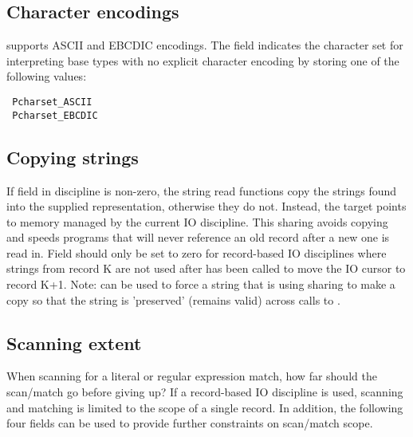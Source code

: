 \subsection{Character encodings}
\label{sec:library-customization-character-encodings}
\pads{} supports ASCII and EBCDIC encodings.
The  field indicates the character set for
interpreting base types with no explicit character encoding by storing
one of the following values:
\begin{verbatim}
 Pcharset_ASCII
 Pcharset_EBCDIC
\end{verbatim}


\subsection{Copying strings} 
\label{sec:library-customization-copy-strings}
 If  field in \pads{} discipline is non-zero, the string read functions
 copy the strings found into the supplied representation, otherwise they do not.
 Instead, the target  points to memory managed by the current
 IO discipline.  This sharing avoids copying and speeds programs that
 will never reference an old record after a new one is read in.
Field  should only be set to zero for record-based IO disciplines where
strings from record K are not used after  has been called to move
the IO cursor to record K+1.  Note:  can be used to
force a string that is using sharing to make a copy so that the string is 'preserved'
(remains valid) across calls to .

\subsection{Scanning extent}
\label{sec:library-customization-scanning-extent}
When scanning for a literal or regular expression match, how far
should the scan/match go before giving up?    If a record-based IO discipline is
used, scanning and matching is limited to the scope of a single record.  In
addition, the following four  fields can be used to provide further
constraints on scan/match scope.  

